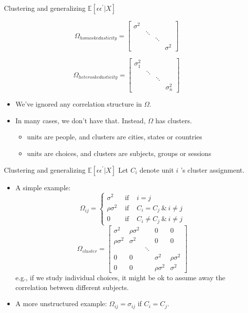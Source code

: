 \begin{frame}{Clustering and generalizing $\mathbb{E}[\epsilon\epsilon^{\prime}|X]$}

 $$\Omega_{homoskedasticity}=\begin{bmatrix}
    \sigma^{2} & & &\\
    & \ddots & &\\
    & & \ddots &\\
    & & & \sigma^{2}
\end{bmatrix}$$

$$\Omega_{heteroskedasticity}=\begin{bmatrix}
    \sigma_{1}^{2} & & &\\
    & \ddots & &\\
    & & \ddots &\\
    & & & \sigma_{n}^{2}
\end{bmatrix}$$
\begin{itemize}
    \item We've ignored any correlation structure in $\Omega$.
    \item In many cases, we don't have that. Instead, $\Omega$ has clusters.
    \begin{itemize}
        \item units are people, and clusters are cities, states or countries
        \item units are choices, and clusters are subjects, groups or sessions
    \end{itemize}
\end{itemize}
\end{frame}

\begin{frame}{Clustering and generalizing $\mathbb{E}[\epsilon\epsilon^{\prime}|X]$}
    Let $C_i$ denote unit $i$ 's cluster assignment.
    \begin{itemize}
        \item A simple example: $$
\Omega_{i j}=\left\{\begin{array}{ccc}
\sigma^2 & \text { if } & i=j \\
\rho \sigma^2 & \text { if } & C_i=C_j ~\&~ i \neq j \\
0 & \text { if } & C_i \neq C_j ~\&~ i \neq j
\end{array}\right.
$$
$$\Omega_{cluster}=\begin{bmatrix}
    \sigma^{2} & \rho \sigma^2  & & 0 & 0\\
    \rho \sigma^2  &\sigma^{2} & & 0 & 0 \\
    & & \ddots & & \\
    0 & 0 & & \sigma^{2} & \rho \sigma^2\\
    0 & 0 & &\rho \sigma^2 & \sigma^{2}
\end{bmatrix}$$
e.g., if we study individual choices, it might be ok to assume away the correlation between different subjects.
\item A more unstructured example: $\Omega_{i j}=\sigma_{i j}$ if $C_i=C_j$.
    \end{itemize}
\end{frame}

